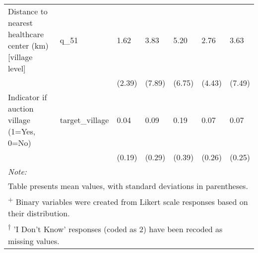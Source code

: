 \begin{table}
\begin{tabular}[t]{lllllll}
\addlinespace
Distance to nearest healthcare center (km) [village level] & q_51 & 1.62 & 3.83 & 5.20 & 2.76 & 3.63\\
 &  & (2.39) & (7.89) & (6.75) & (4.43) & (7.49)\\
Indicator if auction village (1=Yes, 0=No) & target_village & 0.04 & 0.09 & 0.19 & 0.07 & 0.07\\
 &  & (0.19) & (0.29) & (0.39) & (0.26) & (0.25)\\
\bottomrule
\multicolumn{7}{l}{\rule{0pt}{1em}\textit{Note: }}\\
\multicolumn{7}{l}{\rule{0pt}{1em}Table presents mean values, with standard deviations in parentheses.}\\
\multicolumn{7}{l}{\rule{0pt}{1em}\textsuperscript{+} Binary variables were created from Likert scale responses based on their distribution.}\\
\multicolumn{7}{l}{\rule{0pt}{1em}\textsuperscript{†} 'I Don't Know' responses (coded as 2) have been recoded as missing values.}\\
\end{tabular}
\end{table}
